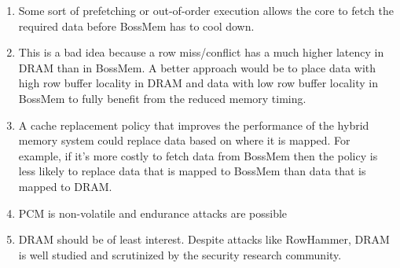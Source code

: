 \documentclass[a4paper]{article}
\begin{document}
\begin{enumerate}[label=\roman*)]
    \item Some sort of prefetching or out-of-order execution allows the core to
    fetch the required data before BossMem has to cool down.

    \item This is a bad idea because a row miss/conflict has a much higher
        latency in DRAM than in BossMem. A better approach would be to place
        data with high row buffer locality in DRAM and data with low row buffer
        locality in BossMem to fully benefit from the reduced memory timing.

    \item A cache replacement policy that improves the performance of the hybrid
        memory system could replace data based on where it is mapped. For
        example, if it's more costly to fetch data from BossMem then the policy
        is less likely to replace data that is mapped to BossMem than data that
        is mapped to DRAM.

    \item PCM is non-volatile and endurance attacks are possible

    \item DRAM should be of least interest. Despite attacks like RowHammer, DRAM
        is well studied and scrutinized by the security research community.
\end{enumerate}
\end{document}
